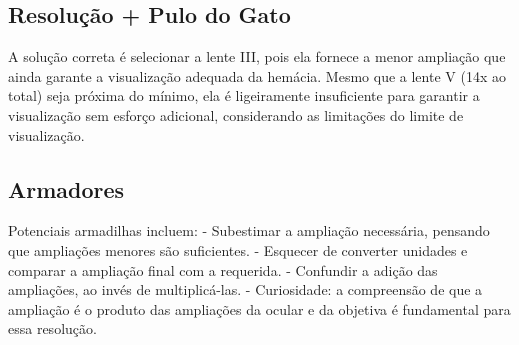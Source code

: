 \documentclass{article}
\begin{document}
\subsection*{Resolução + Pulo do Gato}

A solução correta é selecionar a lente III, pois ela fornece a menor ampliação que ainda garante a visualização adequada da hemácia. Mesmo que a lente V (14x ao total) seja próxima do mínimo, ela é ligeiramente insuficiente para garantir a visualização sem esforço adicional, considerando as limitações do limite de visualização.

\subsection*{Armadores}

Potenciais armadilhas incluem:
- Subestimar a ampliação necessária, pensando que ampliações menores são suficientes.
- Esquecer de converter unidades e comparar a ampliação final com a requerida.
- Confundir a adição das ampliações, ao invés de multiplicá-las.
- Curiosidade: a compreensão de que a ampliação é o produto das ampliações da ocular e da objetiva é fundamental para essa resolução.
\end{document}

